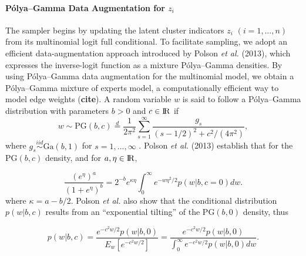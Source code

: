 \documentclass[useAMS,referee]{biom}
\begin{document}
\paragraph{P\'olya--Gamma Data Augmentation for $z_i$} The sampler begins by updating the latent cluster indicators $z_i$ $(i=1,\ldots,n)$ from its multinomial logit full conditional. To facilitate sampling, we adopt an efficient data-augmentation approach introduced by Polson \textit{et al.} (2013), which expresses the inverse-logit function as a mixture P\'olya--Gamma densities. By using P\'olya--Gamma data augmentation for the multinomial model, we obtain a P\'olya--Gamma mixture of experts model, a computationally efficient way to model edge weights (\textbf{cite}). A random variable $w$ is said to follow a P\'olya--Gamma distribution with parameters $b > 0$ and $c \in {\rm I\!R}$ if
\begin{equation}
w \sim \text{PG}(b,c) \stackrel{d}{=} \frac{1}{2\pi^2}\sum_{s=1}^{\infty}\frac{g_s}{(s-1/2)^2 + c^2/(4\pi^2)}, \label{eq:pg1}
\end{equation}
where $g_s \stackrel{iid}{\sim} \text{Ga}(b,1)$ for $s = 1,...,\infty$ . Polson \textit{et al.} (2013) establish that for the $\text{PG}(b,c)$ density, and for $a,\eta \in {\rm I\!R}$, 

\begin{equation}
\frac{(e^{\eta})^a}{(1 + e^{\eta})^b} = 2^{-b}e^{\kappa \eta} \int_{0}^{\infty} e^{-w\eta^2/2}p(w|b,c = 0)dw. \label{eq:pg2}
\end{equation}
where $\kappa = a - b/2$. Polson \textit{et al.} also show that the conditional distribution $p(w|b,c)$ results from an ``exponential tilting'' of the $\text{PG}(b,0)$ density, thus

\begin{equation}
	p(w|b,c) = \frac{e^{-c^2w/2}p(w|b,0)}{E_w[e^{-c^2w/2}]} = \frac{e^{-c^2w/2}p(w|b,0)}{\int_0^\infty e^{-c^2w/2}p(w|b,0)dw}. \label{eq:pg3}
\end{equation}
\end{document}
